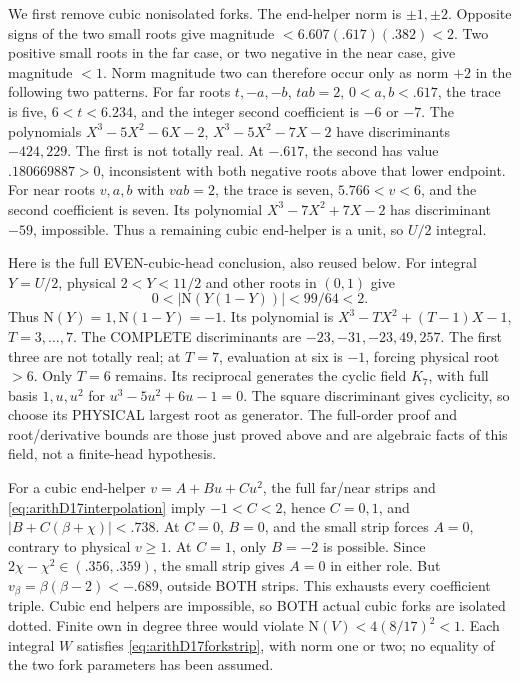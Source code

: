We first remove cubic nonisolated forks.
The end-helper norm is \(\pm1,\pm2\).
Opposite signs of the two small roots give
magnitude \(<6.607(.617)(.382)<2\).
Two positive small roots in the far case,
or two negative in the near case, give magnitude
\(<1\).
Norm magnitude two can therefore occur only
as norm \(+2\) in the following two patterns.
For far roots \(t,-a,-b\), \(tab=2\),
\(0<a,b<.617\), the trace is five,
\(6<t<6.234\), and the integer second
coefficient is \(-6\) or \(-7\).
The polynomials
\(X^3-5X^2-6X-2\),
\(X^3-5X^2-7X-2\)
have discriminants \(-424,229\).
The first is not totally real.
At \(-.617\), the second has value
\(.180669887>0\), inconsistent with both
negative roots above that lower endpoint.
For near roots \(v,a,b\) with \(vab=2\),
the trace is seven, \(5.766<v<6\),
and the second coefficient is seven.
Its polynomial \(X^3-7X^2+7X-2\)
has discriminant \(-59\), impossible.
Thus a remaining cubic end-helper is a unit,
so \(U/2\) integral.

Here is the full EVEN-cubic-head conclusion,
also reused below.
For integral \(Y=U/2\), physical \(2<Y<11/2\)
and other roots in \((0,1)\) give
\[
                       0<|\mathrm N(Y(1-Y))|<99/64<2.
\]
Thus \(\mathrm N(Y)=1,\mathrm N(1-Y)=-1\).
Its polynomial is
\(X^3-TX^2+(T-1)X-1\), \(T=3,\ldots,7\).
The COMPLETE discriminants are
\(-23,-31,-23,49,257\).
The first three are not totally real;
at \(T=7\), evaluation at six is \(-1\),
forcing physical root \(>6\).
Only \(T=6\) remains.
Its reciprocal generates the cyclic field
\(K_7\), with full basis \(1,u,u^2\) for
\(u^3-5u^2+6u-1=0\).
The square discriminant gives cyclicity, so
choose its PHYSICAL largest root as generator.
The full-order proof and root/derivative bounds
are those just proved above and are algebraic
facts of this field, not a finite-head hypothesis.

For a cubic end-helper \(v=A+Bu+Cu^2\),
the full far/near strips and
\eqref{eq:arithD17interpolation} imply
\(-1<C<2\), hence \(C=0,1\), and
\(|B+C(\beta+\chi)|<.738\).
At \(C=0\), \(B=0\), and the small strip
forces \(A=0\), contrary to physical \(v\ge1\).
At \(C=1\), only \(B=-2\) is possible.
Since \(2\chi-\chi^2\in(.356,.359)\),
the small strip gives \(A=0\) in either role.
But \(v_\beta=\beta(\beta-2)<-.689\),
outside BOTH strips.
This exhausts every coefficient triple.
Cubic end helpers are impossible, so BOTH
actual cubic forks are isolated dotted.
Finite own in degree three would violate
\(\mathrm N(V)<4(8/17)^2<1\).
Each integral \(W\) satisfies
\eqref{eq:arithD17forkstrip},
with norm one or two; no equality of the two
fork parameters has been assumed.

